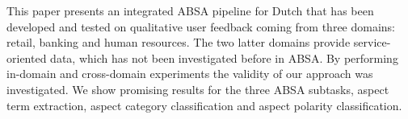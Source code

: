 This paper presents an integrated ABSA pipeline for Dutch that has been developed and tested on qualitative user feedback coming from three domains: retail, banking and human resources. The two latter domains provide service-oriented data, which has not been investigated before in ABSA. By performing in-domain and cross-domain experiments the validity of our approach was investigated. We show promising results for the three ABSA subtasks, aspect term extraction, aspect category classification and aspect polarity classification.
